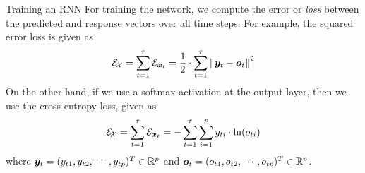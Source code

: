 \begin{frame}{Training an RNN}
%
For training the network, we compute
the error or {\em loss} between the predicted and response vectors over
all time steps. For example, the squared error loss is given as
\begin{align*}
    {\mathcal E}_{\!{\mathcal X}} = \sum_{t=1}^\tau {\mathcal E}_{{\boldsymbol x}_t} = \frac{1}{2} \cdot
    \sum^{\tau}_{t=1} \left\lVert{\boldsymbol y}_t - {\boldsymbol o}_t\right\rVert^2
\end{align*}
On the other hand, if we use a softmax activation at the output layer,
then we use the cross-entropy loss, given as
\begin{align*}
    {\mathcal E}_{\!{\mathcal X}} = \sum_{t=1}^\tau {\mathcal E}_{{\boldsymbol x}_t} =
    - \sum^{\tau}_{t=1} \sum^{p}_{i=1} y_{ti} \cdot \ln(o_{ti})
\end{align*}
where ${\boldsymbol y}_t = (y_{t1}, y_{t2}, \cdots, y_{tp})^T \in {\mathord{\mathbb R}}^p$ and
${\boldsymbol o}_t = (o_{t1}, o_{t2}, \cdots, o_{tp})^T \in {\mathord{\mathbb R}}^p$.
\end{frame}
%
%
